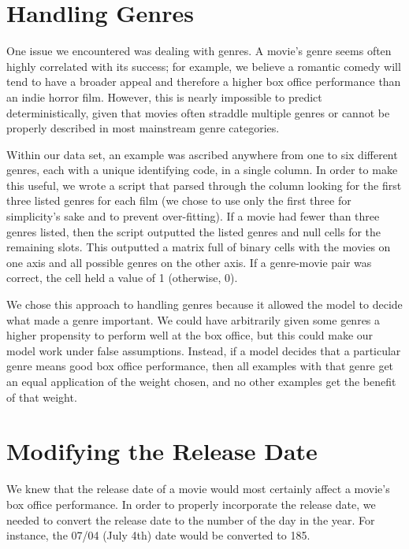 \documentclass{article}
\begin{document}
\section*{Handling Genres}
\vspace{0.2in}

One issue we encountered was dealing with genres. A movie's genre seems often highly correlated with its success; for example, we believe a romantic comedy will tend to have a broader appeal and therefore a higher box office performance than an indie horror film. However, this is nearly impossible to predict deterministically, given that movies often straddle multiple genres or cannot be properly described in most mainstream genre categories.

Within our data set, an example was ascribed anywhere from one to six different genres, each with a unique identifying code, in a single column. In order to make this useful, we wrote a script that parsed through the column looking for the first three listed genres for each film (we chose to use only the first three for simplicity's sake and to prevent over-fitting). If a movie had fewer than three genres listed, then the script outputted the listed genres and null cells for the remaining slots. This outputted a matrix full of binary cells with the movies on one axis and all possible genres on the other axis. If a genre-movie pair was correct, the cell held a value of 1 (otherwise, 0).

We chose this approach to handling genres because it allowed the model to decide what made a genre important. We could have arbitrarily given some genres a higher propensity to perform well at the box office, but this could make our model work under false assumptions. Instead, if a model decides that a particular genre means good box office performance, then all examples with that genre get an equal application of the weight chosen, and no other examples get the benefit of that weight.

\section*{Modifying the Release Date}
\vspace{0.2in}

We knew that the release date of a movie would most certainly affect a movie’s box office performance. In order to properly incorporate the release date, we needed to convert the release date to the number of the day in the year. For instance, the 07/04 (July 4th) date would be converted to 185.
\end{document}
